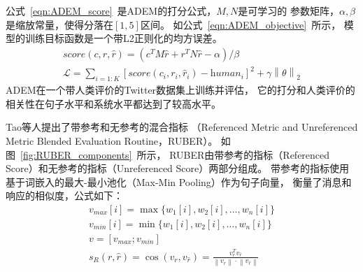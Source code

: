 公式~\ref{eqn:ADEM_score}~是ADEM的打分公式，$M, N$是可学习的
参数矩阵，$\alpha, \beta$是缩放常量，使得分落在$[1, 5]$区间。
如公式~\ref{eqn:ADEM_objective}~所示，
模型的训练目标函数是一个带L2正则化的均方误差。
\begin{align}
    \textit{score}(c, r, \hat{r}) = (c^T M \hat{r} + r^T N \hat{r} - \alpha) / \beta
    \label{eqn:ADEM_score} \\
    \mathcal{L} = \sum_{i=1:K} [\textit{score}(c_i, r_i, \hat{r}_i) - \textit{human}_i]^2 + \gamma \left\| \theta \right\| _2
    \label{eqn:ADEM_objective}
\end{align}
ADEM在一个带人类评价的Twitter数据集上训练并评估，
它的打分和人类评价的相关性在句子水平和系统水平都达到了较高水平。

Tao等人提出了带参考和无参考的混合指标
（Referenced Metric and Unreferenced Metric Blended Evaluation Routine，RUBER）。
如图~\ref{fig:RUBER_components}~所示，
RUBER由带参考的指标（Referenced Score）和无参考的指标（Unreferenced Score）两部分组成。
带参考的指标使用
基于词嵌入的最大-最小池化（Max-Min Pooling）作为句子向量，
衡量了消息和响应的相似度，公式如下：
\begin{align}
    v_{max}[i] = \max \{ w_1[i], w_2[i], \dots, w_n[i] \} \\
    v_{min}[i] = \min \{ w_1[i], w_2[i], \dots, w_n[i] \} \\
    v = [v_{max}; v_{min}] \\
    s_R(r, \hat{r}) = \cos(v_r, v_{\hat{r}}) =
    \frac{v_r^T v_{\hat{r}}}{\left\| v_r \right\| \cdot \left\| v_{\hat{r}} \right\|}
\end{align}

